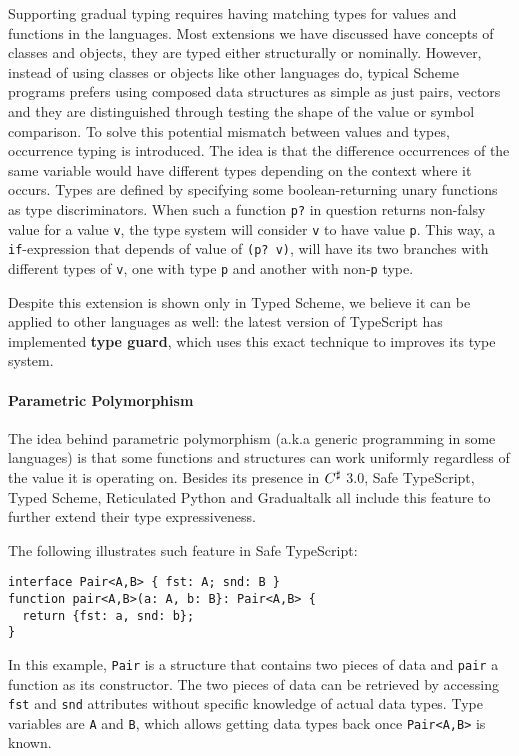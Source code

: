 Supporting gradual typing requires having matching types for values and functions in the languages.
Most extensions we have discussed have concepts of classes and objects, they are typed either
structurally or nominally.
However, instead of using classes or objects like other languages do,
typical Scheme programs prefers using composed data structures as simple as just pairs, vectors
and they are distinguished through testing the shape of the value or symbol comparison.
To solve this potential mismatch between values and types, occurrence typing is introduced.
The idea is that the difference occurrences of the same variable would have different types
depending on the context where it occurs.
Types are defined by specifying some boolean-returning unary functions as type discriminators.
When such a function \texttt{p?} in question returns non-falsy value for a value \texttt{v},
the type system will consider \texttt{v} to have value \texttt{p}.
This way, a \texttt{if}-expression that depends of value of \texttt{(p? v)},
will have its two branches with different types of \texttt{v}, one with type \texttt{p}
and another with non-\texttt{p} type.

Despite this extension is shown only in Typed Scheme, we believe it can be applied to other languages
as well: the latest version of TypeScript has implemented \textbf{type guard},
which uses this exact technique to improves its type system.

\paragraph{Parametric Polymorphism}

The idea behind parametric polymorphism (a.k.a generic programming in some languages)
is that some functions and structures can
work uniformly regardless of the value it is operating on.
Besides its presence in $C^\sharp$ 3.0,
Safe TypeScript, Typed Scheme, Reticulated Python and Gradualtalk all include
this feature to further extend their type expressiveness.

The following illustrates such feature in Safe TypeScript:

\begin{verbatim}
interface Pair<A,B> { fst: A; snd: B }
function pair<A,B>(a: A, b: B}: Pair<A,B> {
  return {fst: a, snd: b};
}
\end{verbatim}

In this example, \texttt{Pair} is a structure that contains two pieces of data and
\texttt{pair} a function as its constructor.
The two pieces of data can be retrieved
by accessing \texttt{fst} and \texttt{snd} attributes without specific knowledge
of actual data types. Type variables are \texttt{A} and \texttt{B}, which
allows getting data types back once \texttt{Pair<A,B>} is known.

